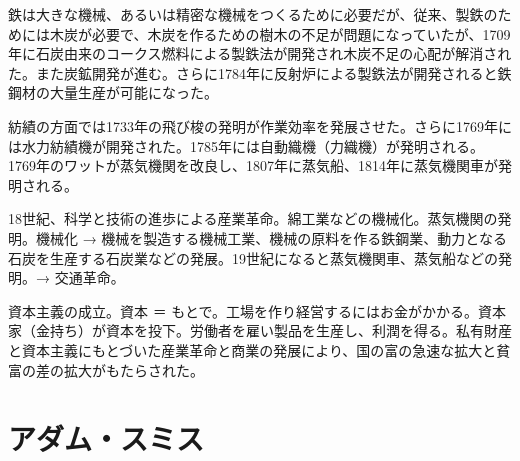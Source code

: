 \documentclass[uplatex,dvipdfmx]{jsarticle} \usepackage{mystyle}%
\begin{document}

鉄は大きな機械、あるいは精密な機械をつくるために必要だが、従来、製鉄のためには木炭が必要で、木炭を作るための樹木の不足が問題になっていたが、1709年に石炭由来のコークス燃料による製鉄法が開発され木炭不足の心配が解消された。また炭鉱開発が進む。さらに1784年に反射炉による製鉄法が開発されると鉄鋼材の大量生産が可能になった。

紡績の方面では1733年の飛び梭の発明が作業効率を発展させた。さらに1769年には水力紡績機が開発された。1785年には自動織機（力織機）が発明される。
1769年のワットが蒸気機関を改良し、1807年に蒸気船、1814年に蒸気機関車が発明される。








 18世紀、科学と技術の進歩による産業革命。綿工業などの機械化。蒸気機関の発明。機械化 → 機械を製造する機械工業、機械の原料を作る鉄鋼業、動力となる石炭を生産する石炭業などの発展。19世紀になると蒸気機関車、蒸気船などの発明。→ 交通革命。

   資本主義の成立。資本 ＝ もとで。工場を作り経営するにはお金がかかる。資本家（金持ち）が資本を投下。労働者を雇い製品を生産し、利潤を得る。私有財産と資本主義にもとづいた産業革命と商業の発展により、国の富の急速な拡大と貧富の差の拡大がもたらされた。







\section{アダム・スミス}
\end{document}
